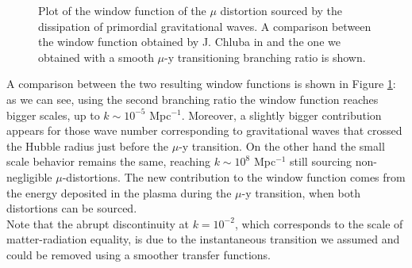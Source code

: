 \begin{figure}
    \centering
{}
\caption{Plot of the window function of the $\mu$ distortion sourced by the dissipation of primordial gravitational waves. A comparison between the window function obtained by J. Chluba in \cite{Chluba_tens_diss} and the one we obtained with a smooth $\mu$-y transitioning branching ratio is shown.}
\label{fig:mu_window}
\end{figure}
A comparison between the two resulting window functions is shown in Figure \ref{fig:mu_window}: as we can see, using the second branching ratio the window function reaches bigger scales, up to $k\sim10^{-5}$ Mpc$^{-1}$. Moreover, a slightly bigger contribution appears for those wave number corresponding to gravitational waves that crossed the Hubble radius just before the $\mu$-y transition. On the other hand the small scale behavior remains the same, reaching $k\sim10^{8}$ Mpc$^{-1}$ still sourcing non-negligible $\mu$-distortions. The new contribution to the window function comes from the energy deposited in the plasma during the $\mu$-y transition, when both distortions can be sourced.\\
Note that the abrupt discontinuity at $k=10^{-2}$, which corresponds to the scale of matter-radiation equality, is due to the instantaneous transition we assumed and could be removed using a smoother transfer functions.

